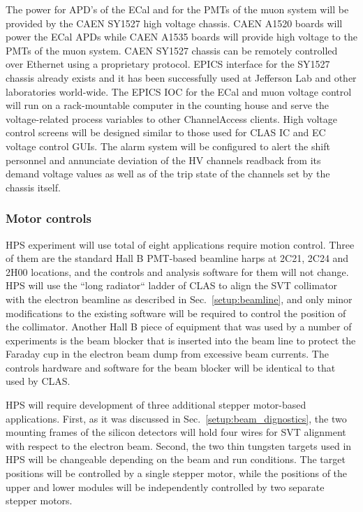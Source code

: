 The power for APD's of the ECal and for the PMTs of the muon system  will be provided by the   
CAEN SY1527 high voltage chassis. CAEN A1520 boards will power the ECal APDs while CAEN A1535 boards will 
provide high voltage to the PMTs of the muon system. CAEN SY1527 chassis can be remotely controlled over Ethernet 
using a proprietary protocol. EPICS interface for the SY1527 chassis already exists and it has been successfully 
used at Jefferson Lab and other laboratories world-wide. The EPICS IOC for the ECal and muon voltage 
control will run on a rack-mountable computer in the counting house and serve the voltage-related process 
variables to other ChannelAccess clients. High voltage control screens will be designed 
similar to those used for CLAS IC and EC voltage control GUIs. The alarm system will be configured to alert 
the shift personnel and annunciate deviation of the HV channels readback from its demand voltage values as  
well as of the trip state of the channels set by the chassis itself.    


\subsubsection{Motor controls}
\label{sec:ctrls:motor}
HPS experiment will use total of eight applications require motion control. Three of them 
are the standard Hall B PMT-based beamline harps at 2C21, 2C24 and 2H00 locations,  and the controls 
and analysis software for them will not change.  HPS will use the ``long radiator`` ladder of CLAS to align  
the SVT collimator with the electron beamline as described in Sec.~\ref{setup:beamline}, and only minor 
modifications to the existing software will be required to control the position of the collimator.
Another Hall B piece of equipment that was used by a number of experiments is the beam blocker that is inserted 
into the beam line to protect the Faraday cup in the electron beam dump from excessive beam currents. The 
controls hardware and software for the beam blocker will be identical to that used by CLAS. 

HPS will require development of three additional stepper motor-based applications. 
First, as it was discussed in Sec.~\ref{setup:beam_dignostics}, the two mounting frames of the silicon detectors 
will hold four wires for SVT alignment with respect to the electron beam. Second, the two thin 
tungsten targets used in HPS will be changeable depending on the beam and run conditions. The target 
positions will be controlled by a single stepper motor, while the positions of the upper and lower 
modules will be independently controlled by two separate stepper motors. 

